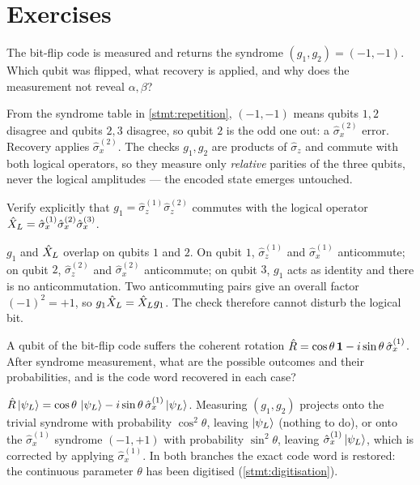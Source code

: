 \section*{Exercises}

\begin{exercise}
The bit-flip code is measured and returns the syndrome
$(g_1,g_2)=(-1,-1)$. Which qubit was flipped, what recovery is applied,
and why does the measurement not reveal $\alpha,\beta$?
\begin{solution}
From the syndrome table in \cref{stmt:repetition}, $(-1,-1)$ means qubits
$1,2$ disagree and qubits $2,3$ disagree, so qubit $2$ is the odd one
out: a $\hat\sigma_x^{(2)}$ error. Recovery applies $\hat\sigma_x^{(2)}$.
The checks $g_1,g_2$ are products of $\hat\sigma_z$ and commute with both
logical operators, so they measure only \emph{relative} parities of the
three qubits, never the logical amplitudes --- the encoded state emerges
untouched.
\end{solution}
\end{exercise}

\begin{exercise}
Verify explicitly that $g_1=\hat\sigma_z^{(1)}\hat\sigma_z^{(2)}$
commutes with the logical operator
$\hat{X}_L=\hat\sigma_x^{(1)}\hat\sigma_x^{(2)}\hat\sigma_x^{(3)}$.
\begin{solution}
$g_1$ and $\hat{X}_L$ overlap on qubits $1$ and $2$. On qubit $1$,
$\hat\sigma_z^{(1)}$ and $\hat\sigma_x^{(1)}$ anticommute; on qubit $2$,
$\hat\sigma_z^{(2)}$ and $\hat\sigma_x^{(2)}$ anticommute; on qubit $3$,
$g_1$ acts as identity and there is no anticommutation. Two
anticommuting pairs give an overall factor $(-1)^2=+1$, so
$g_1\hat{X}_L=\hat{X}_L g_1$. The check therefore cannot disturb the
logical bit.
\end{solution}
\end{exercise}

\begin{exercise}
A qubit of the bit-flip code suffers the coherent rotation
$\hat{R}=\cos\theta\,\mathbf{1}-i\sin\theta\,\hat\sigma_x^{(1)}$. After syndrome
measurement, what are the possible outcomes and their probabilities, and
is the code word recovered in each case?
\begin{solution}
$\hat{R}\ket{\psi_L}=\cos\theta\,\ket{\psi_L}
-i\sin\theta\,\hat\sigma_x^{(1)}\ket{\psi_L}$. Measuring $(g_1,g_2)$
projects onto the trivial syndrome with probability $\cos^2\theta$,
leaving $\ket{\psi_L}$ (nothing to do), or onto the
$\hat\sigma_x^{(1)}$ syndrome $(-1,+1)$ with probability $\sin^2\theta$,
leaving $\hat\sigma_x^{(1)}\ket{\psi_L}$, which is corrected by applying
$\hat\sigma_x^{(1)}$. In both branches the exact code word is restored:
the continuous parameter $\theta$ has been digitised
(\cref{stmt:digitisation}).
\end{solution}
\end{exercise}

